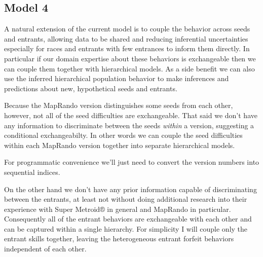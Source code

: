 \documentclass[
  letterpaper,
  DIV=11,
  numbers=noendperiod]{scrartcl}
\newenvironment{Shaded}{\begin{snugshade}}{\end{snugshade}}
\newcommand{\AttributeTok}[1]{\textcolor[rgb]{0.40,0.45,0.13}{#1}}
\newcommand{\DecValTok}[1]{\textcolor[rgb]{0.68,0.00,0.00}{#1}}
\newcommand{\FunctionTok}[1]{\textcolor[rgb]{0.28,0.35,0.67}{#1}}
\newcommand{\NormalTok}[1]{\textcolor[rgb]{0.00,0.23,0.31}{#1}}
\newcommand{\OtherTok}[1]{\textcolor[rgb]{0.00,0.23,0.31}{#1}}
\newcommand{\SpecialCharTok}[1]{\textcolor[rgb]{0.37,0.37,0.37}{#1}}
\begin{document}
\subsection{Model 4}\label{model-4}

A natural extension of the current model is to couple the behavior
across seeds and entrants, allowing data to be shared and reducing
inferential uncertainties especially for races and entrants with few
entrances to inform them directly. In particular if our domain expertise
about these behaviors is exchangeable then we can couple them together
with hierarchical models. As a side benefit we can also use the inferred
hierarchical population behavior to make inferences and predictions
about new, hypothetical seeds and entrants.

Because the MapRando version distinguishes some seeds from each other,
however, not all of the seed difficulties are exchangeable. That said we
don't have any information to discriminate between the seeds
\emph{within} a version, suggesting a conditional exchangeabilty. In
other words we can couple the seed difficulties within each MapRando
version together into separate hierarchical models.

For programmatic convenience we'll just need to convert the version
numbers into sequential indices.

\begin{Shaded}
\end{Shaded}

On the other hand we don't have any prior information capable of
discriminating between the entrants, at least not without doing
additional research into their experience with Super Metroid® in general
and MapRando in particular. Consequently all of the entrant behaviors
are exchangeable with each other and can be captured within a single
hierarchy. For simplicity I will couple only the entrant skills
together, leaving the heterogeneous entrant forfeit behaviors
independent of each other.
\end{document}

